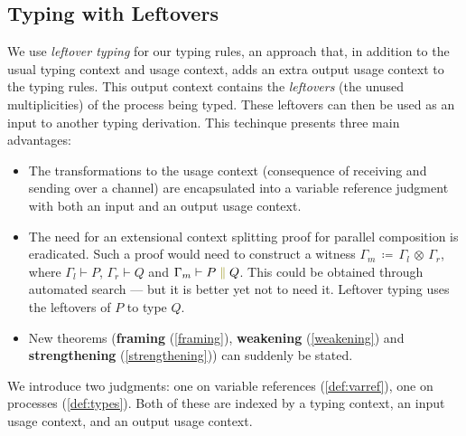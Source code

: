 \documentclass[a4paper,UKenglish,cleveref, autoref, thm-restate,authorcolumns]{lipics-v2019}
\theoremstyle{definition}
\newcommand{\constr}[1]{\textcolor{olive}{\operatorname{#1}}}
\newcommand{\comp}[2]{#1 \; \constr{\parallel} \; #2}
\newcommand{\opctx}[3]{#1 \, \coloneqq \, #2 \, \otimes \, #3}
\begin{document}
\subsection{Typing with Leftovers}
\label{leftover-typing}

We use \emph{leftover typing} \cite{Allais2018a} for our typing rules, an approach that, in addition to the usual typing context and usage context, adds an extra output usage context to the typing rules.
This output context contains the \emph{leftovers} (the unused multiplicities) of the process being typed.
These leftovers can then be used as an input to another typing derivation.
This techinque presents three main advantages:
\begin{itemize}
  \item
    The transformations to the usage context (consequence of receiving and sending over a channel) are encapsulated into a variable reference judgment with both an input and an output usage context.
  \item
    The need for an extensional context splitting proof for parallel composition is eradicated.
    Such a proof would need to construct a witness $\opctx{\Gamma_m}{\Gamma_l}{\Gamma_r}$, where $\Gamma_l \vdash P$, $\Gamma_r \vdash Q$ and $\Gamma_m \vdash \comp{P}{Q}$.
    This could be obtained through automated search --- but it is better yet not to need it.
    Leftover typing uses the leftovers of $P$ to type $Q$.
  \item
    New theorems (\textbf{framing} (\autoref{framing}), \textbf{weakening} (\autoref{weakening}) and \textbf{strengthening} (\autoref{strengthening})) can suddenly be stated.
\end{itemize}
  
We introduce two judgments: one on variable references (\autoref{def:varref}), one on processes (\autoref{def:types}).
Both of these are indexed by a typing context, an input usage context, and an output usage context.
\end{document}
